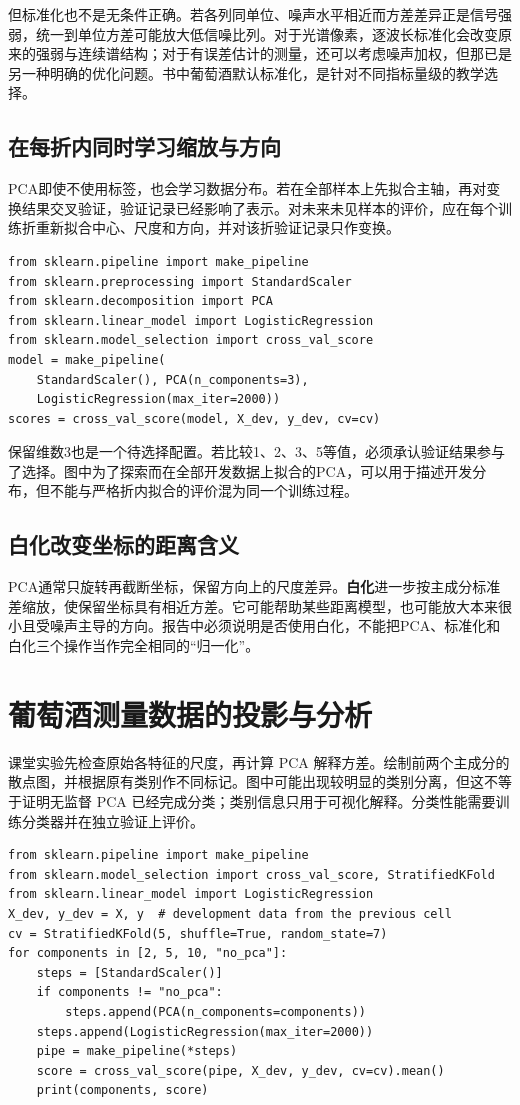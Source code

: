 但标准化也不是无条件正确。若各列同单位、噪声水平相近而方差差异正是信号强弱，统一到单位方差可能放大低信噪比列。对于光谱像素，逐波长标准化会改变原来的强弱与连续谱结构；对于有误差估计的测量，还可以考虑噪声加权，但那已是另一种明确的优化问题。书中葡萄酒默认标准化，是针对不同指标量级的教学选择。

\subsection{在每折内同时学习缩放与方向}
PCA即使不使用标签，也会学习数据分布。若在全部样本上先拟合主轴，再对变换结果交叉验证，验证记录已经影响了表示。对未来未见样本的评价，应在每个训练折重新拟合中心、尺度和方向，并对该折验证记录只作变换。

\begin{lstlisting}[caption={把方向选择放进每一折，而不是先对全数据降维}]
from sklearn.pipeline import make_pipeline
from sklearn.preprocessing import StandardScaler
from sklearn.decomposition import PCA
from sklearn.linear_model import LogisticRegression
from sklearn.model_selection import cross_val_score
model = make_pipeline(
    StandardScaler(), PCA(n_components=3),
    LogisticRegression(max_iter=2000))
scores = cross_val_score(model, X_dev, y_dev, cv=cv)
\end{lstlisting}

保留维数3也是一个待选择配置。若比较1、2、3、5等值，必须承认验证结果参与了选择。图中为了探索而在全部开发数据上拟合的PCA，可以用于描述开发分布，但不能与严格折内拟合的评价混为同一个训练过程。

\subsection{白化改变坐标的距离含义}
PCA通常只旋转再截断坐标，保留方向上的尺度差异。\textbf{白化}进一步按主成分标准差缩放，使保留坐标具有相近方差。它可能帮助某些距离模型，也可能放大本来很小且受噪声主导的方向。报告中必须说明是否使用白化，不能把PCA、标准化和白化三个操作当作完全相同的“归一化”。

\section{葡萄酒测量数据的投影与分析}
课堂实验先检查原始各特征的尺度，再计算 PCA 解释方差。绘制前两个主成分的散点图，并根据原有类别作不同标记。图中可能出现较明显的类别分离，但这不等于证明无监督 PCA 已经完成分类；类别信息只用于可视化解释。分类性能需要训练分类器并在独立验证上评价。

\begin{lstlisting}[caption={将 PCA 纳入监督分类流程，避免折间泄漏}]
from sklearn.pipeline import make_pipeline
from sklearn.model_selection import cross_val_score, StratifiedKFold
from sklearn.linear_model import LogisticRegression
X_dev, y_dev = X, y  # development data from the previous cell
cv = StratifiedKFold(5, shuffle=True, random_state=7)
for components in [2, 5, 10, "no_pca"]:
    steps = [StandardScaler()]
    if components != "no_pca":
        steps.append(PCA(n_components=components))
    steps.append(LogisticRegression(max_iter=2000))
    pipe = make_pipeline(*steps)
    score = cross_val_score(pipe, X_dev, y_dev, cv=cv).mean()
    print(components, score)
\end{lstlisting}

